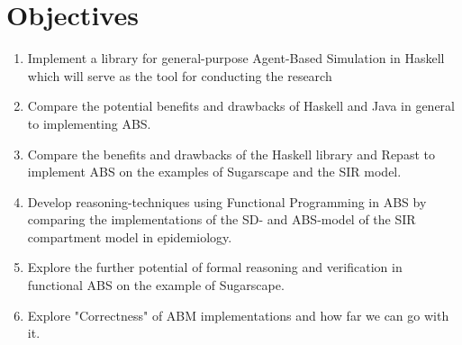 \section{Objectives}
\begin{enumerate}
	\item Implement a library for general-purpose Agent-Based Simulation in Haskell which will serve as the tool for conducting the research 
	
	\item Compare the potential benefits and drawbacks of Haskell and Java in general to implementing ABS.
	
	\item Compare the benefits and drawbacks of the Haskell library and Repast to implement ABS on the examples of Sugarscape and the SIR model.
	
	\item Develop reasoning-techniques using Functional Programming in ABS by comparing the implementations of the SD- and ABS-model of the SIR compartment model in epidemiology.
	
	\item Explore the further potential of formal reasoning and verification in functional ABS on the example of Sugarscape.
	
	\item Explore "Correctness" of ABM implementations and how far we can go with it.
\end{enumerate}

